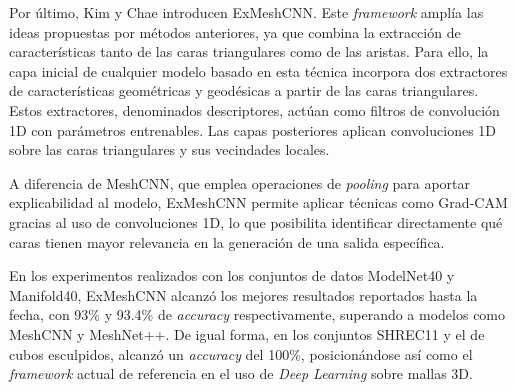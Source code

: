 Por último, Kim y Chae \cite{kim_exmeshcnn_2022} introducen ExMeshCNN. Este \textit{framework} amplía las ideas propuestas por métodos anteriores, ya que combina la extracción de características tanto de las caras triangulares como de las aristas. Para ello, la capa inicial de cualquier modelo basado en esta técnica incorpora dos extractores de características geométricas y geodésicas a partir de las caras triangulares. Estos extractores, denominados descriptores, actúan como filtros de convolución 1D con parámetros entrenables. Las capas posteriores aplican convoluciones 1D sobre las caras triangulares y sus vecindades locales.

A diferencia de MeshCNN, que emplea operaciones de \textit{pooling} para aportar explicabilidad al modelo, ExMeshCNN permite aplicar técnicas como Grad-CAM gracias al uso de convoluciones 1D, lo que posibilita identificar directamente qué caras tienen mayor relevancia en la generación de una salida específica.

En los experimentos realizados con los conjuntos de datos ModelNet40 y Manifold40, ExMeshCNN alcanzó los mejores resultados reportados hasta la fecha, con 93\% y 93.4\% de \textit{accuracy} respectivamente, superando a modelos como MeshCNN y MeshNet++. De igual forma, en los conjuntos SHREC11 y el de cubos esculpidos, alcanzó un \textit{accuracy} del 100\%, posicionándose así como el \textit{framework} actual de referencia en el uso de \textit{Deep Learning} sobre mallas 3D.